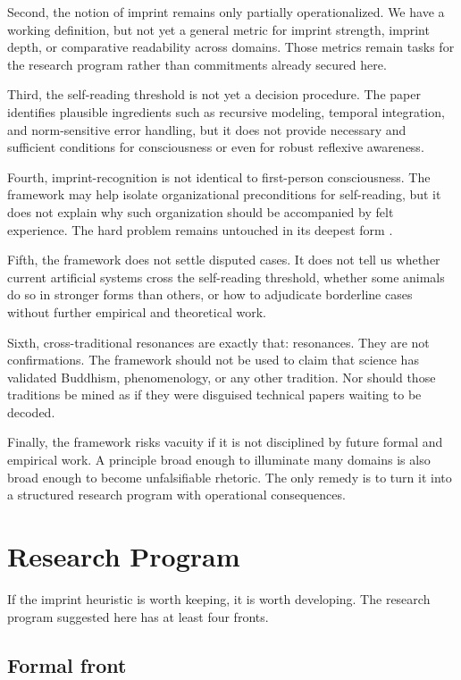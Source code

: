 \documentclass[12pt,a4paper]{article}
\begin{document}
Second, the notion of imprint remains only partially operationalized. We have a working definition, but not yet a general metric for imprint strength, imprint depth, or comparative readability across domains. Those metrics remain tasks for the research program rather than commitments already secured here.

Third, the self-reading threshold is not yet a decision procedure. The paper identifies plausible ingredients such as recursive modeling, temporal integration, and norm-sensitive error handling, but it does not provide necessary and sufficient conditions for consciousness or even for robust reflexive awareness.

Fourth, imprint-recognition is not identical to first-person consciousness. The framework may help isolate organizational preconditions for self-reading, but it does not explain why such organization should be accompanied by felt experience. The hard problem remains untouched in its deepest form \cite{Levine1983,Chalmers1996}.

Fifth, the framework does not settle disputed cases. It does not tell us whether current artificial systems cross the self-reading threshold, whether some animals do so in stronger forms than others, or how to adjudicate borderline cases without further empirical and theoretical work.

Sixth, cross-traditional resonances are exactly that: resonances. They are not confirmations. The framework should not be used to claim that science has validated Buddhism, phenomenology, or any other tradition. Nor should those traditions be mined as if they were disguised technical papers waiting to be decoded.

Finally, the framework risks vacuity if it is not disciplined by future formal and empirical work. A principle broad enough to illuminate many domains is also broad enough to become unfalsifiable rhetoric. The only remedy is to turn it into a structured research program with operational consequences.

\section{Research Program}

If the imprint heuristic is worth keeping, it is worth developing. The research program suggested here has at least four fronts.

\subsection{Formal front}
\end{document}
